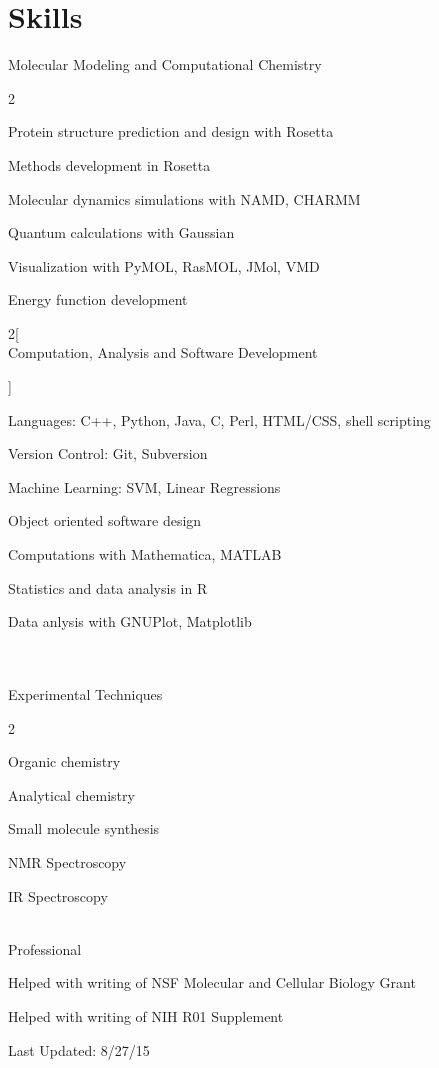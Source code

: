 \documentclass[12pt]{article}
\newcommand{\allcapsspacing}[1]{{\addfontfeature{LetterSpace=7.5}#1}}
\newcommand{\skillsitem}[1]{
\noindent 
#1\vspace{0.25\baselineskip}\par}
\begin{document}
\section*{\allcapsspacing{Skills}}

\skillsitem{Molecular Modeling and Computational Chemistry}
\begin{multicols}{2}
\begin{compactitem}
\item Protein structure prediction and design with Rosetta
\item Methods development in Rosetta 
\item Molecular dynamics simulations with NAMD, CHARMM
\item Quantum calculations with Gaussian
\item Visualization with PyMOL, RasMOL, JMol, VMD
\item Energy function development
\end{compactitem}
\end{multicols}

\begin{multicols}{2}[\skillsitem{\\Computation, Analysis and Software Development}]
\begin{compactitem}
\item Languages: C++, Python, Java, C, Perl, HTML/CSS, shell scripting
\item Version Control: Git, Subversion 
\item Machine Learning: SVM, Linear Regressions
\item Object oriented software design
\item Computations with Mathematica, MATLAB
\item Statistics and data analysis in R
\item Data anlysis with GNUPlot, Matplotlib 
\end{compactitem} 
\end{multicols}

\skillsitem{\\\\Experimental Techniques} 
\begin{multicols}{2}
\begin{compactitem}
\item Organic chemistry
\item Analytical chemistry
\item Small molecule synthesis
\item NMR Spectroscopy
\item IR Spectroscopy
\end{compactitem}
\end{multicols}

\skillsitem{\\Professional}
\begin{compactitem}
\item Helped with writing of NSF Molecular and Cellular Biology Grant
\item Helped with writing of NIH R01 Supplement \\
\end{compactitem}

Last Updated: 8/27/15
\end{document}
